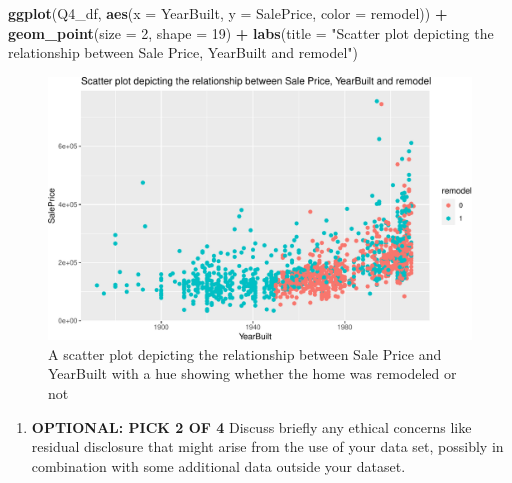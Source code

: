 \documentclass[
]{article}
\newenvironment{Shaded}{\begin{snugshade}}{\end{snugshade}}
\newcommand{\AttributeTok}[1]{\textcolor[rgb]{0.13,0.29,0.53}{#1}}
\newcommand{\DecValTok}[1]{\textcolor[rgb]{0.00,0.00,0.81}{#1}}
\newcommand{\FunctionTok}[1]{\textcolor[rgb]{0.13,0.29,0.53}{\textbf{#1}}}
\newcommand{\NormalTok}[1]{#1}
\newcommand{\SpecialCharTok}[1]{\textcolor[rgb]{0.81,0.36,0.00}{\textbf{#1}}}
\newcommand{\StringTok}[1]{\textcolor[rgb]{0.31,0.60,0.02}{#1}}
\providecommand{\tightlist}{%
  \setlength{\itemsep}{0pt}\setlength{\parskip}{0pt}}
\begin{document}
\begin{Shaded}
\begin{Highlighting}[]
\FunctionTok{ggplot}\NormalTok{(Q4\_df, }\FunctionTok{aes}\NormalTok{(}\AttributeTok{x =}\NormalTok{ YearBuilt, }\AttributeTok{y =}\NormalTok{ SalePrice,}
    \AttributeTok{color =}\NormalTok{ remodel)) }\SpecialCharTok{+} \FunctionTok{geom\_point}\NormalTok{(}\AttributeTok{size =} \DecValTok{2}\NormalTok{, }\AttributeTok{shape =} \DecValTok{19}\NormalTok{) }\SpecialCharTok{+}
    \FunctionTok{labs}\NormalTok{(}\AttributeTok{title =} \StringTok{"Scatter plot depicting the relationship between Sale Price, YearBuilt and remodel"}\NormalTok{)}
\end{Highlighting}
\end{Shaded}

\begin{figure}
\centering
\includegraphics{STAT847_W24_Final_files/figure-latex/unnamed-chunk-26-1.pdf}
\caption{A scatter plot depicting the relationship between Sale Price
and YearBuilt with a hue showing whether the home was remodeled or not}
\end{figure}

\vspace{2cm}

\vspace{2cm}

\newpage

\begin{enumerate}
\def\labelenumi{\arabic{enumi})}
\setcounter{enumi}{7}
\tightlist
\item
  \textbf{OPTIONAL: PICK 2 OF 4} Discuss briefly any ethical concerns
  like residual disclosure that might arise from the use of your data
  set, possibly in combination with some additional data outside your
  dataset.
\end{enumerate}
\end{document}

